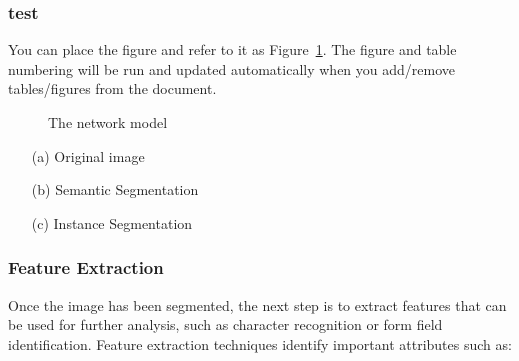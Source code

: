 \documentclass[12pt,oneside,openright,a4paper]{cpe-english-project}
\begin{document}
\subsubsection{test}

You can place the figure and refer to it as Figure~\ref{fig:model2}.
The figure and table numbering will be run and updated automatically when you add/remove tables/figures from the document.

\begin{figure}[!h]\centering
\setlength{\fboxrule}{0.2mm} %
\setlength{\fboxsep}{1cm}
\caption{The network model}\label{fig:model2}
\end{figure}

\begin{enumerate}
    \item[(a)] Original image
    \item[(b)] Semantic Segmentation
    \item[(c)] Instance Segmentation
\end{enumerate}

\subsubsection{Feature Extraction} Once the image has been segmented, the next step is to extract  features that can be used for further analysis, such as character recognition or form field identification. Feature extraction techniques identify important attributes such as: 
\end{document}
